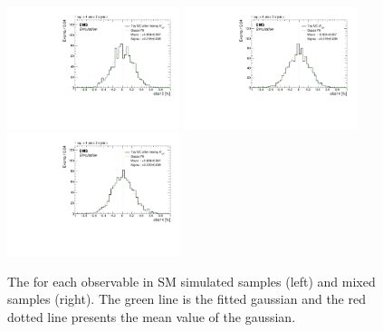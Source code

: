 \begin{figure}
    \includegraphics[width=0.45\textwidth]{figure/SimAcp_RunII_co_obs12_mixed.pdf}
    \includegraphics[width=0.45\textwidth]{figure/SimAcp_RunII_co_obs14.pdf}
    \includegraphics[width=0.45\textwidth]{figure/SimAcp_RunII_co_obs14_mixed.pdf}
    \caption[The \Acpprime for each observable in SM simulated \ttbar samples and mixed samples.]
    {
        The \Acpprime for each observable in SM simulated \ttbar samples (left) and mixed samples (right).
        The green line is the fitted gaussian and the red dotted line presents the mean value of the gaussian.
    }
    \label{fig:correlation_study}
\end{figure}

